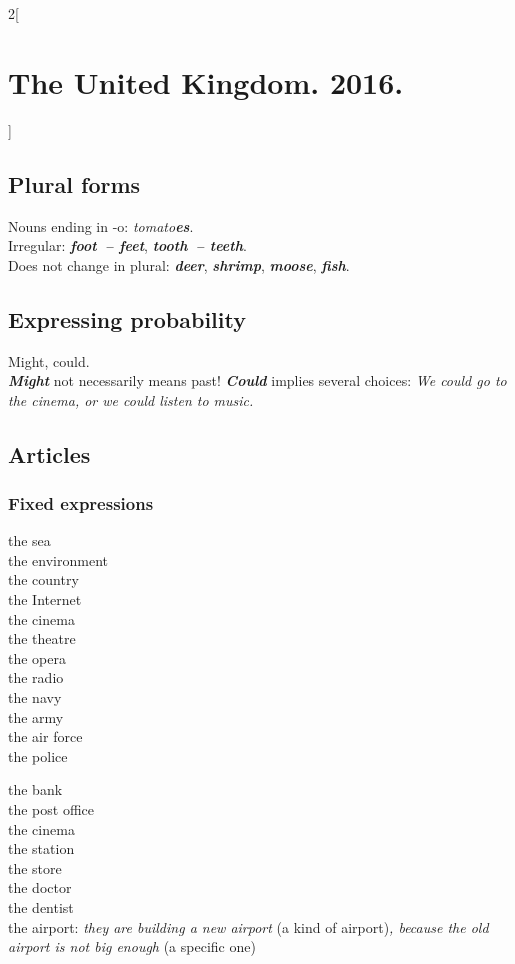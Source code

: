 \documentclass[10pt,a4paper]{article}
\newcommand\ex[1]{\textit{\textbf{{#1}}}}           %
\begin{document}
\begin{multicols}{2}[\section{The United Kingdom. 2016.}]
\subsection{Plural forms}
Nouns ending in -o: \textit{tomato\ex{es}}.\\
Irregular: \ex{foot~-- feet}, \ex{tooth~-- teeth}.\\
Does not change in plural: \ex{deer}, \ex{shrimp}, \ex{moose}, \ex{fish}.




\subsection{Expressing probability}
Might, could.\\
\ex{Might} not necessarily means past! \ex{Could} implies several choices: \textit{We could go to the
cinema, or we could listen to music.}






\subsection{Articles}

\subsubsection{Fixed expressions}

\begin{minipage}{0.32\linewidth}
the sea\\
the environment\\
the country\\
the Internet\\
the cinema\\
the theatre\\
the opera\\
the radio\\
the navy\\
the army\\
the air force\\
the police
\end{minipage}
\begin{minipage}{0.65\linewidth}
the bank\\
the post office\\
the cinema\\
the station\\
the store\\
the doctor\\
the dentist\\
the airport: \textit{they are building a new airport} (a kind of airport)\textit{, because the
old airport is not big enough} (a specific one)
\end{minipage}


\end{multicols}
\end{document}
